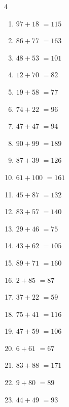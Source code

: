 \begin{multicols}{4}
\begin{enumerate}
  \item $97+18$
        $=115$

  \item $86+77$
        $=163$

  \item $48+53$
        $=101$

  \item $12+70$
        $=82$

  \item $19+58$
        $=77$

  \item $74+22$
        $=96$

  \item $47+47$
        $=94$

  \item $90+99$
        $=189$

\columnbreak %

\resetques

  \item $87+39$
        $=126$

  \item $61+100$
        $=161$

  \item $45+87$
        $=132$

  \item $83+57$
        $=140$

  \item $29+46$
        $=75$

  \item $43+62$
        $=105$

  \item $89+71$
        $=160$

  \item $2+85$
        $=87$

  \item $37+22$
        $=59$

  \item $75+41$
        $=116$

  \item $47+59$
        $=106$

  \item $6+61$
        $=67$

  \item $83+88$
        $=171$

  \item $9+80$
        $=89$

  \item $44+49$
        $=93$


\end{enumerate}
\end{multicols}
